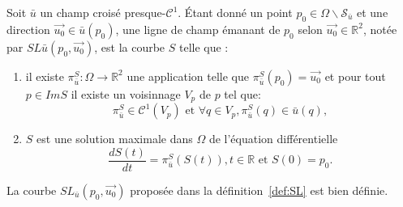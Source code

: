 \begin{definition}
\label{def:SL}
Soit $\bar{u}$ un champ croisé presque-$\mathcal{C}^1$. Étant donné un point $p_0\in \Omega\backslash \mathcal{S}_{\bar{u}}$ et une direction $\overrightarrow{u_0}\in \bar{u}(p_0)$, une ligne de champ émanant de $p_0$ selon $\overrightarrow{u_0}\in \mathbb{R}^2$, notée par $SL{\bar{u}}(p_0,\overrightarrow{u_0})$, est la courbe $S$ telle que :

\begin{enumerate}
\item il existe $\pi_{\bar{u}}^S:\Omega\longrightarrow\mathbb{R}^2$ une application telle que $\pi_{\bar{u}}^S(p_0)=\overrightarrow{u_0}$ et pour tout $p\in Im S$ il existe un voisinnage $V_p$ de $p$ tel que:
\begin{equation}
\label{eqn:pi_u_S}
\pi_{\bar{u}}^S\in\mathcal{C}^1(V_p) \mbox{ et }  \forall q\in V_p, \pi_{\bar{u}}^S(q)\in \bar{u}(q),
\end{equation}
\item $S$ est une solution maximale dans $\Omega$ de l'équation différentielle
\begin{equation}
\label{eqn:streamline}
\frac{dS(t)}{dt}=\pi_{\bar{u}}^S(S(t)),t\in \mathbb{R} \text{ et }  S(0)=p_0.
\end{equation}
\end{enumerate}
\end{definition}

\begin{lemma}
\label{lem:def_streamline_lemma}
La courbe $SL_{\bar{u}}(p_0,\overrightarrow{u_0})$ proposée dans la définition~\ref{def:SL} est bien définie.
\end{lemma}

